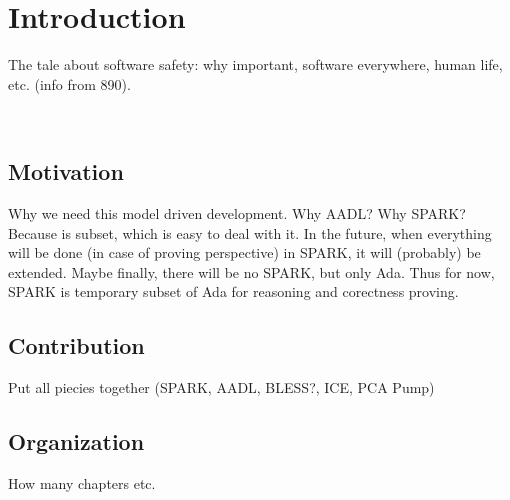 
\cleardoublepage


\chapter{Introduction}
\label{introduction}

The tale about software safety: why important, software everywhere, human life, etc. (info from 890).

\

\section{Motivation}
\label{introduction:motivation}
Why we need this model driven development.
Why AADL?
Why SPARK? Because is subset, which is easy to deal with it. In the future, when everything will be done (in case of proving perspective) in SPARK, it will (probably) be extended. Maybe finally, there will be no SPARK, but only Ada. Thus for now, SPARK is temporary subset of Ada for reasoning and corectness proving.

\section{Contribution}
\label{introduction:contribution}
Put all piecies together (SPARK, AADL, BLESS?, ICE, PCA Pump)

\section{Organization}
\label{introduction:organization}
How many chapters etc.
